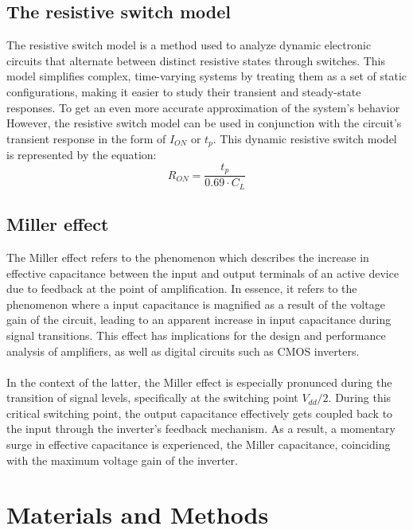 \documentclass[onecolumn]{article}
\begin{document}
\subsection{The resistive switch model}
The resistive switch model is a method used to analyze dynamic electronic circuits that alternate between distinct resistive states through switches. This model simplifies complex, time-varying systems by treating them as a set of static configurations, making it easier to study their transient and steady-state responses. To get an even more accurate approximation of the system's behavior However, the resistive switch model can be used in conjunction with the circuit's transient response in the form of $I_{ON}$ or $t_p$. This dynamic resistive switch model is represented by the equation:
\begin{equation}\label{eq:ron}
    R_{ON} = \frac{t_p}{0.69 \cdot C_L}
\end{equation}


\subsection{Miller effect}
The Miller effect refers to the phenomenon which describes the increase in effective capacitance between the input and output terminals of an active device due to feedback at the point of amplification. In essence, it refers to the phenomenon where a input capacitance is magnified as a result of the voltage gain of the circuit, leading to an apparent increase in input capacitance during signal transitions. This effect has implications for the design and performance analysis of amplifiers, as well as digital circuits such as CMOS inverters.

\paragraph{} In the context of the latter, the Miller effect is especially pronunced during the transition of signal levels, specifically at the switching point $V_{dd}/2$. During this critical switching point, the output capacitance effectively gets coupled back to the input through the inverter's feedback mechanism. As a result, a momentary surge in effective capacitance is experienced, the Miller capacitance, coinciding with the maximum voltage gain of the inverter.


\section{Materials and Methods}
\end{document}
